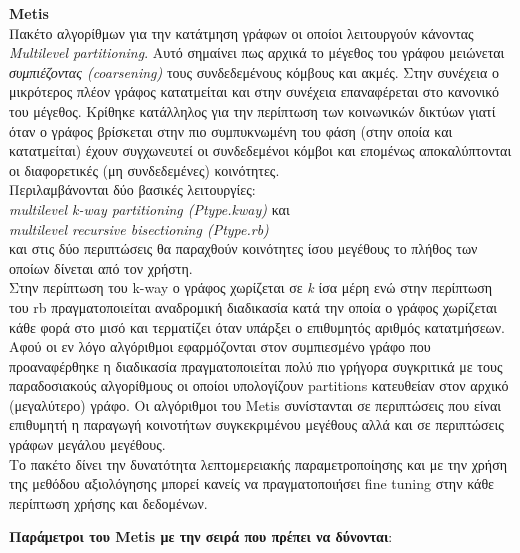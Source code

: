 \begin{description}
\item \textbf{Metis}  \hfill \\
Πακέτο αλγορίθμων για  την κατάτμηση γράφων οι οποίοι λειτουργούν 
κάνοντας \emph{Multilevel partitioning}. Αυτό σημαίνει πως αρχικά το μέγεθος του γράφου 
μειώνεται \emph{συμπιέζοντας (coarsening)} τους συνδεδεμένους κόμβους και ακμές. 
Στην συνέχεια ο μικρότερος πλέον γράφος κατατμείται και στην συνέχεια επαναφέρεται στο 
κανονικό του μέγεθος. Κρίθηκε κατάλληλος για την περίπτωση των κοινωνικών δικτύων 
γιατί όταν ο γράφος βρίσκεται στην πιο συμπυκνωμένη του φάση (στην οποία και κατατμείται)
έχουν συγχωνευτεί οι συνδεδεμένοι κόμβοι και επομένως αποκαλύπτονται οι διαφορετικές 
(μη συνδεδεμένες) κοινότητες.\\
Περιλαμβάνονται δύο βασικές λειτουργίες: \\
\emph{multilevel k-way partitioning (Ptype.kway)} και\\ 
\emph{multilevel recursive bisectioning (Ptype.rb)}\\
και στις δύο περιπτώσεις θα παραχθούν κοινότητες ίσου μεγέθους το πλήθος των οποίων 
δίνεται από τον χρήστη.\\
Στην περίπτωση του k-way ο γράφος χωρίζεται σε \emph{k} ίσα μέρη ενώ στην περίπτωση του 
rb πραγματοποιείται αναδρομική διαδικασία κατά την οποία ο γράφος χωρίζεται κάθε φορά
στο μισό και τερματίζει όταν υπάρξει ο επιθυμητός αριθμός κατατμήσεων. \\
Αφού οι εν λόγο αλγόριθμοι εφαρμόζονται στον συμπιεσμένο γράφο που προαναφέρθηκε
η διαδικασία πραγματοποιείται πολύ πιο γρήγορα συγκριτικά με τους παραδοσιακούς 
αλγορίθμους οι οποίοι υπολογίζουν partitions κατευθείαν στον αρχικό (μεγαλύτερο) γράφο.
\cite{miettinen}
Οι αλγόριθμοι του Metis συνίστανται σε περιπτώσεις που είναι επιθυμητή η παραγωγή κοινοτήτων 
συγκεκριμένου μεγέθους αλλά και σε περιπτώσεις γράφων μεγάλου μεγέθους.\\
Το πακέτο δίνει την δυνατότητα λεπτομερειακής παραμετροποίησης 
και με την χρήση της μεθόδου αξιολόγησης μπορεί κανείς να πραγματοποιήσει fine tuning 
στην κάθε περίπτωση χρήσης και δεδομένων.
\end{description} 

\clearpage

\textbf{Παράμετροι του Metis με την σειρά που πρέπει να δύνονται}:

